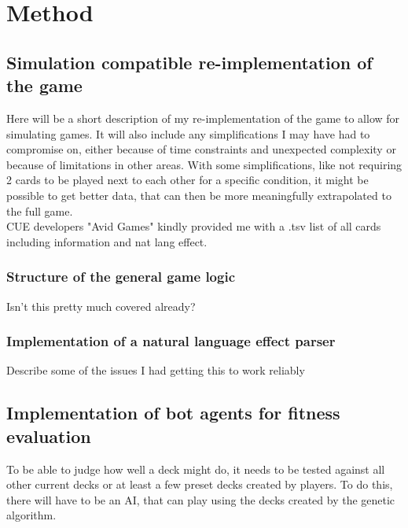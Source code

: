 \chapter{Method}
\label{ch:method}


\section{Simulation compatible re-implementation of the game}
\label{sec:method:game}
Here will be a short description of my re-implementation of the game to allow for simulating games. It will also include any simplifications I may have had to compromise on, either because of time constraints and unexpected complexity or because of limitations in other areas. With some simplifications, like not requiring 2 cards to be played next to each other for a specific condition, it might be possible to get better data, that can then be more meaningfully extrapolated to the full game.\\
CUE developers "Avid Games" kindly provided me with a .tsv list of all cards including information and nat lang effect.

\subsection{Structure of the general game logic}
\label{sec:method:game:general}
Isn't this pretty much covered already? \\

\subsection{Implementation of a natural language effect parser}
\label{sec:method:game:natlang_parser}
Describe some of the issues I had getting this to work reliably


\section{Implementation of bot agents for fitness evaluation}
\label{sec:method:agents}
To be able to judge how well a deck might do, it needs to be tested against all other current decks or at least a few preset decks created by players. To do this, there will have to be an AI, that can play using the decks created by the genetic algorithm.

